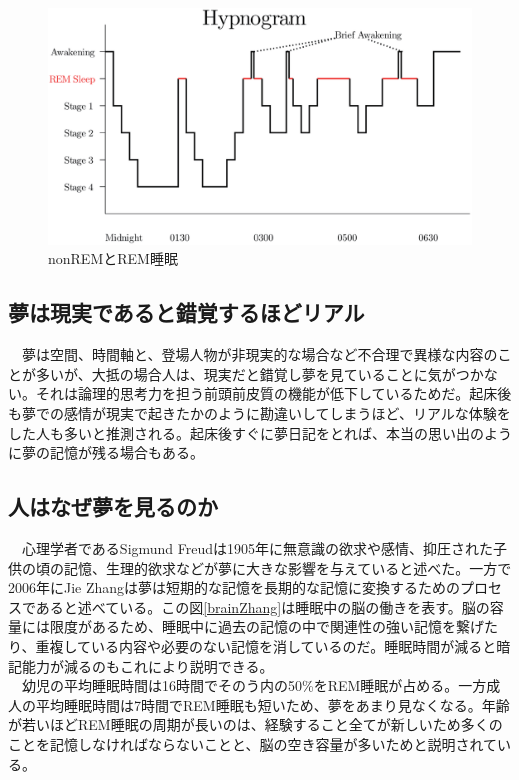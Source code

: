 \begin{figure}[htbp]
\begin{center}
\includegraphics[width=15cm]{eps/SleepHypnogram.eps}
\caption{nonREMとREM睡眠}
\label{SleepHypnogram}
\end{center}
\end{figure}

\subsection{夢は現実であると錯覚するほどリアル}
　夢は空間、時間軸と、登場人物が非現実的な場合など不合理で異様な内容のことが多いが、大抵の場合人は、現実だと錯覚し夢を見ていることに気がつかない。それは論理的思考力を担う前頭前皮質の機能が低下しているためだ\cite{cortex}。起床後も夢での感情が現実で起きたかのように勘違いしてしまうほど、リアルな体験をした人も多いと推測される。起床後すぐに夢日記をとれば、本当の思い出のように夢の記憶が残る場合もある。

\subsection{人はなぜ夢を見るのか}
　心理学者であるSigmund Freudは1905年に無意識の欲求や感情、抑圧された子供の頃の記憶、生理的欲求などが夢に大きな影響を与えていると述べた\cite{freud}。一方で2006年にJie Zhangは夢は短期的な記憶を長期的な記憶に変換するためのプロセスであると述べている。この図\ref{brainZhang}は睡眠中の脳の働きを表す。脳の容量には限度があるため、睡眠中に過去の記憶の中で関連性の強い記憶を繋げたり、重複している内容や必要のない記憶を消しているのだ\cite{Zhang}。睡眠時間が減ると暗記能力が減るのもこれにより説明できる。\\
　幼児の平均睡眠時間は16時間でそのう内の50\%をREM睡眠が占める。一方成人の平均睡眠時間は7時間でREM睡眠も短いため、夢をあまり見なくなる。年齢が若いほどREM睡眠の周期が長いのは、経験すること全てが新しいため多くのことを記憶しなければならないことと、脳の空き容量が多いためと説明されている。

